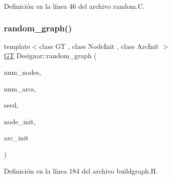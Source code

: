 Definición en la línea 46 del archivo random.\+C.

\mbox{\label{namespace_designar_aee2e3d201a649a468dbe1def58fd285a}} 
\subsubsection{\texorpdfstring{random\+\_\+graph()}{random\_graph()}\hspace{0.1cm}{\footnotesize\ttfamily [1/3]}}
{\footnotesize\ttfamily template$<$class GT , class Node\+Init , class Arc\+Init $>$ \\
\hyperlink{demo-buildgraph_8_c_a3001c40d2c31ca87ed96cd7d1334a55e}{GT} Designar\+::random\+\_\+graph (\begin{DoxyParamCaption}\item[{\hyperlink{namespace_designar_aa72662848b9f4815e7bf31a7cf3e33d1}{nat\+\_\+t}}]{num\+\_\+nodes,  }\item[{\hyperlink{namespace_designar_aa72662848b9f4815e7bf31a7cf3e33d1}{nat\+\_\+t}}]{num\+\_\+arcs,  }\item[{\hyperlink{namespace_designar_ad621b5646d45288c5d6a1e1dfe7531a8}{rng\+\_\+seed\+\_\+t}}]{seed,  }\item[{Node\+Init \&}]{node\+\_\+init,  }\item[{Arc\+Init \&}]{arc\+\_\+init }\end{DoxyParamCaption})}



Definición en la línea 184 del archivo buildgraph.\+H.

\mbox{\label{namespace_designar_ae9fce2578ac6b598baf1ecb7e38f77cf}} 
